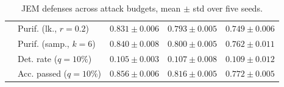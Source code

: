 \begin{table}[htbp]
\begin{tabular}{@{}llrrr@{}}
 & Purif. (lk., $r=0.2$) & $0.831 \pm 0.006$ & $\mathbf{0.793 \pm 0.005}$ & $\mathbf{0.749 \pm 0.006}$ \\
 & Purif. (samp., $k=6$) & $0.840 \pm 0.008$ & $\mathbf{0.800 \pm 0.005}$ & $\mathbf{0.762 \pm 0.011}$ \\
 & Det. rate ($q=10\%$) & $0.105 \pm 0.003$ & $0.107 \pm 0.008$ & $0.109 \pm 0.012$ \\
 & Acc. passed ($q=10\%$) & $0.856 \pm 0.006$ & $\mathbf{0.816 \pm 0.005}$ & $\mathbf{0.772 \pm 0.005}$ \\
\bottomrule
\end{tabular}
\caption{JEM defenses across attack budgets, mean $\pm$ std over five seeds.}
\label{tab:jem_mnist_r12_models_all_eps}
\end{table}
